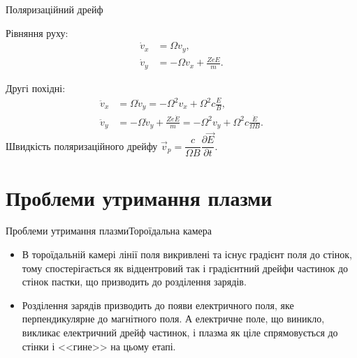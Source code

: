 \documentclass[]{beamer}
\begin{document}
\begin{frame}{Поляризаційний дрейф}{}
\begin{onlyenv}
	Рівняння руху:
	\begin{align*}
		\dot{v}_x & = \Omega v_y,                  \\
		\dot{v}_y & = -\Omega v_x + \frac{ZeE}{m}.
	\end{align*}

	Другі похідні:
	\begin{align*}
		\ddot{v}_x & = \Omega \dot{v}_y = -\Omega^2 v_x + \Omega^2
		c\frac{E}{B},                                     \\
		\ddot{v}_y & = -\Omega \dot{v}_y + \frac{Ze\dot{E}}{m} = -\Omega^2 v_y + \Omega^2
		c\frac{\dot{E}}{\Omega B}.
	\end{align*}
	Швидкість поляризаційного дрейфу
	\(
	\vec{v}_p = \dfrac{c}{\Omega B}\dfrac{\partial \vec{E}}{\partial t}.
	\)
\end{onlyenv}
\end{frame}




\section{Проблеми утримання плазми}




\begin{frame}{Проблеми утримання плазми}{Тороїдальна камера}\small
	\begin{itemize}\justifying
		\item В тороїдальній камері лінії поля викривлені та існує градієнт поля до стінок, тому спостерігається як \alert{відцентровий} так і \alert{градієнтний} дрейфи частинок до стінок пастки, що призводить до розділення зарядів.


		\item Розділення зарядів призводить до появи електричного поля, яке перпендикулярне до магнітного поля. А електричне поле, що виникло, викликає \alert{електричний} дрейф частинок, і плазма як ціле спрямовується до стінки і <<гине>> на цьому етапі.
	\end{itemize}
	\begin{center}
		
	\end{center}
\end{frame}
\end{document}
